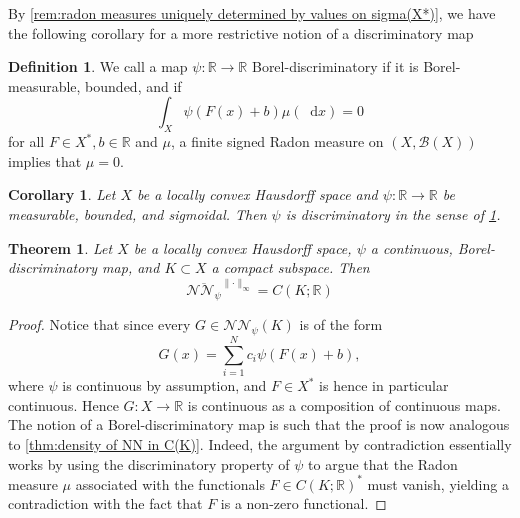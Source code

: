 \documentclass[11pt,a4paper,twoside,openany]{report}
\newcommand{\diff}{\mathop{}\!\mathrm{d}}
\theoremstyle{plain} %
\newtheorem{theorem}{Theorem}[chapter]
\newtheorem{corollary}[corollary]{Corollary}
\theoremstyle{definition} %
\newtheorem{definition}[definition]{Definition}
\theoremstyle{remark} %
\begin{document}
By \cref{rem:radon measures uniquely determined by values on sigma(X*)}, we have the following corollary for a more restrictive notion of a discriminatory map
\begin{definition}\label{def:Borel discriminatory property of X}
 We call a map \(\psi:\mathbb{R}\to\mathbb{R}\) Borel-discriminatory if it is Borel-measurable, bounded, and if
    \begin{equation}
        \int_{X}\psi(F(x)+b)\mu(\diff x)=0
    \end{equation}
    for all \(F\in X^*,b\in\mathbb{R}\) and \(\mu\), a finite signed Radon measure on \((X,\mathcal{B}(X))\) implies that \(\mu=0\).    
\end{definition}
\begin{corollary}
     Let \(X\) be a locally convex Hausdorff space and \(\psi:\mathbb{R}\to\mathbb{R}\) be measurable, bounded, and sigmoidal. Then \(\psi\) is discriminatory in the sense of \cref{def:Borel discriminatory property of X}.
\end{corollary}
\begin{theorem}
    Let \(X\) be a locally convex Hausdorff space, \(\psi\) a continuous, Borel-discriminatory map, and \(K\subset X\) a compact subspace. Then
    \begin{equation}
       \overline{\mathcal{NN}_{\psi}}^{\lVert\cdot\rVert_{\infty}}=C(K;\mathbb{R})
    \end{equation}
\end{theorem}
\begin{proof}
Notice that since every \(G\in\mathcal{NN}_{\psi}(K)\) is of the form 
    \begin{equation}
        G(x) =\sum_{i=1}^Nc_i\psi(F(x)+b),
    \end{equation}
    where \(\psi\) is continuous by assumption, and \(F\in X^*\) is hence in particular continuous. Hence \(G:X\to\mathbb{R}\) is continuous as a composition of continuous maps.
 The notion of a Borel-discriminatory map is such that the proof is now analogous to \cref{thm:density of NN in C(K)}. Indeed, the argument by contradiction essentially works by using the discriminatory property of \(\psi\) to argue that the Radon measure \(\mu\) associated with the functionals \(F\in C(K;\mathbb{R})^*\) must vanish, yielding a contradiction with the fact that \(F\) is a non-zero functional. 
 \end{proof}
\end{document}
